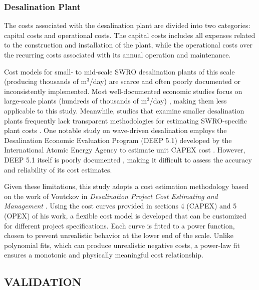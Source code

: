 \documentclass[twocolumn,10pt]{asme2e}
\begin{document}
\subsubsection{Desalination Plant}
The costs associated with the desalination plant are divided into two categories: capital costs and operational costs. The capital costs includes all expenses related to the construction and installation of the plant, while the operational costs over the recurring costs associated with its annual operation and maintenance.

Cost models for small- to mid-scale SWRO desalination plants of this scale (producing thousands of m$^3$/day) are scarce and often poorly documented or inconsistently implemented. Most well-documented economic studies focus on large-scale plants (hundreds of thousands of m$^3$/day) \cite{Slocum2016,Haefner2023,roopexcurve,Wittholz2008}, making them less applicable to this study. Meanwhile, studies that examine smaller desalination plants frequently lack transparent methodologies for estimating SWRO-specific plant costs \cite{Elkadeem2024,Goekcek2016}. One notable study on wave-driven desalination employs the Desalination Economic Evaluation Program (DEEP 5.1) developed by the International Atomic Energy Agency to estimate unit CAPEX cost \cite{Yu2022}. However, DEEP 5.1 itself is poorly documented \cite{DEEP5manual}, making it difficult to assess the accuracy and reliability of its cost estimates. 

Given these limitations, this study adopts a cost estimation methodology based on the work of Voutckov in \emph{Desalination Project Cost Estimating and Management} \cite{voutch}. Using the cost curves provided in sections 4 (CAPEX) and 5 (OPEX) of his work, a flexible cost model is developed that can be customized for different project specifications. Each curve is fitted to a power function, chosen to prevent unrealistic behavior at the lower end of the scale. Unlike polynomial fits, which can produce unrealistic negative costs, a power-law fit ensures a monotonic and physically meaningful cost relationship.

\subsection{VALIDATION}
\end{document}
